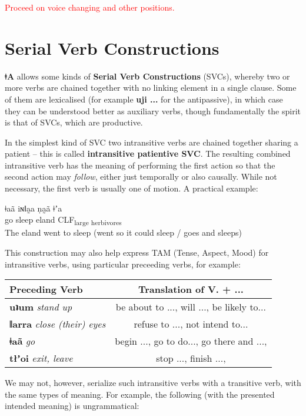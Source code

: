 \documentclass[11pt,a5paper]{book}
\newcommand{\qcn}[1]{\textcolor{AccentText}{\large\textbf{#1}}}
\newcommand{\langname}{\qcn{ǂA}}
\newcommand{\transl}[2]{\qcn{#1} \emph{#2}}
\newcommand{\grammsc}[1]{\textsc{#1}}
\newcommand{\CLF}[1]{\grammsc{CLF}\textsubscript{#1}}
\newcommand{\cmnt}[1]{\textcolor{red}{#1}}
\begin{document}
\cmnt{Proceed on voice changing and other positions.}

\section{Serial Verb Constructions}

\langname{} allows some kinds of \textbf{Serial Verb Constructions} (SVCs), whereby two or more verbs are chained together with no linking element in a single clause. Some of them are lexicalised (for example \qcn{uji ...} for the antipassive), in which case they can be understood better as auxiliary verbs, though fundamentally the spirit is that of SVCs, which are productive.

In the simplest kind of SVC two intransitive verbs are chained together sharing a patient -- this is called \textbf{intransitive patientive SVC}. The resulting combined intransitive verb has the meaning of performing the first action so that the second action may \emph{follow}, either just temporally or also causally. While not necessary, the first verb is usually one of motion. A practical example:

\begin{exe}
\ex
\gll ǂaã iɴǁa̰a ṇa̰ã ǂʼa \\
go sleep eland \CLF{large herbivores}\\
\glt The eland went to sleep (went so it could sleep / goes and sleeps)
\end{exe}

This construction may also help express TAM (Tense, Aspect, Mood) for intransitive verbs, using particular preceeding verbs, for example:

\begin{center}
\begin{tabular}{|l|c|}
\hline
Preceding Verb  & Translation of V. + ...\\ \hline\hline
 \transl{uʇum}{stand up} & be about to ..., will ..., be likely to...\\ \hline
\transl{ǁarra}{close (their) eyes} & refuse to ..., not intend to...\\ \hline
\transl{ǂaã}{go} & begin ..., go to do..., go there and ..., \\ \hline
\transl{tłʼoi}{exit, leave} & stop ..., finish ..., \\ \hline
\end{tabular}
\end{center}

We may not, however, serialize such intransitive verbs with a transitive verb, with the same types of meaning. For example, the following (with the presented intended meaning) is ungrammatical:
\end{document}
